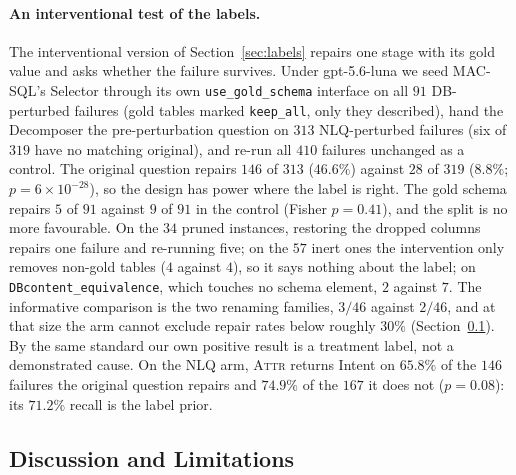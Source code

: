 \documentclass{llncs}
\begin{document}
\paragraph{An interventional test of the labels.}
\label{sec:counterfactual}
The interventional version of Section~\ref{sec:labels} repairs one stage
with its gold value and asks whether the failure survives. Under
gpt-5.6-luna we seed MAC-SQL's Selector through its own
\texttt{use\_gold\_schema} interface on all $91$ DB-perturbed failures (gold
tables marked \texttt{keep\_all}, only they described), hand the Decomposer
the pre-perturbation question on $313$ NLQ-perturbed failures (six of $319$
have no matching original), and re-run all $410$ failures unchanged as a
control. The original question
repairs $146$ of $313$ ($46.6\%$) against $28$ of $319$ ($8.8\%$;
$p = 6{\times}10^{-28}$), so the design has power where the label is right.
The gold schema repairs $5$ of $91$ against $9$ of $91$ in the control
(Fisher $p = 0.41$), and the split is no more favourable. On the $34$ pruned
instances, restoring the dropped columns repairs one failure and re-running
five; on the $57$ inert ones the intervention only removes non-gold tables
($4$ against $4$), so it says nothing about the label; on
\texttt{DBcontent\_equivalence}, which touches no schema element, $2$
against $7$. The informative comparison is the two renaming families,
$3/46$ against $2/46$, and at that size the arm cannot exclude repair rates
below roughly $30\%$ (Section~\ref{sec:limitations}). By the same standard our own
positive result is a treatment label, not a demonstrated cause. On the NLQ arm, \textsc{Attr} returns Intent on $65.8\%$ of the $146$
failures the original question repairs and $74.9\%$ of the $167$ it does not
($p = 0.08$): its $71.2\%$ recall is the label prior.

\subsection{Discussion and Limitations}
\label{sec:limitations}
\end{document}
